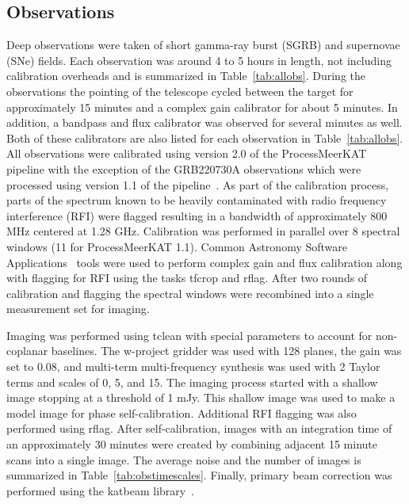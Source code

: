\documentclass[12pt]{article}
\begin{document}
\subsection{Observations}
\label{sec:observations3}
Deep observations were taken of short gamma-ray burst (SGRB) and supernovae (SNe) fields. Each observation was around 4 to 5 hours in length, not including calibration overheads and is summarized in Table~\ref{tab:allobs}. During the observations the pointing of the telescope cycled between the target for approximately 15 minutes and a complex gain calibrator for about 5 minutes. In addition, a bandpass and flux calibrator was observed for several minutes as well. Both of these calibrators are also listed for each observation in Table~\ref{tab:allobs}. All observations were calibrated using version 2.0 of the ProcessMeerKAT pipeline with the exception of the GRB220730A observations which were processed using version 1.1 of the pipeline~\citep[{\sc ProcessMeerKAT};][]{pminprep}. As part of the calibration process, parts of the spectrum known to be heavily contaminated with radio frequency interference (RFI) were flagged resulting in a bandwidth of approximately 800 MHz centered at 1.28 GHz. Calibration was performed in parallel over 8 spectral windows (11 for ProcessMeerKAT 1.1). Common Astronomy Software Applications~\citep[{\sc CASA;}][]{2022arXiv221002276T} tools were used to perform complex gain and flux calibration along with flagging for RFI using the tasks tfcrop and rflag. After two rounds of calibration and flagging the spectral windows were recombined into a single measurement set for imaging.

Imaging was performed using tclean with special parameters to account for non-coplanar baselines. The w-project gridder was used with 128 planes, the gain was set to 0.08, and multi-term multi-frequency synthesis was used with 2 Taylor terms and scales of 0, 5, and 15. The imaging process started with a shallow image stopping at a threshold of 1 mJy. This shallow image was used to make a model image for phase self-calibration. Additional RFI flagging was also performed using rflag. After self-calibration, images with an integration time of an approximately 30 minutes were created by combining adjacent 15 minute scans into a single image. The average noise and the number of images is summarized in Table~\ref{tab:obstimescales}. Finally, primary beam correction was performed using the katbeam library~\citep{2022AJ....163..135D}. 
\end{document}
